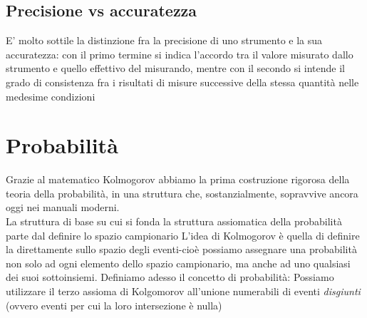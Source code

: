 \documentclass{report}
\begin{document}
	\section{Precisione vs accuratezza}
	E' molto sottile la distinzione fra la precisione di uno strumento e la sua accuratezza: con il primo termine si indica l'accordo tra il valore misurato dallo strumento e quello effettivo del misurando, mentre con il secondo si intende il grado di consistenza fra i risultati di misure successive della stessa quantità nelle medesime condizioni
	\chapter{Probabilità}
	Grazie al matematico Kolmogorov abbiamo la prima costruzione rigorosa della teoria della probabilità, in una struttura che, sostanzialmente, sopravvive ancora oggi nei manuali moderni. \\
	La struttura di base su cui si fonda la struttura assiomatica della probabilità parte dal definire lo spazio campionario
\noindent L'idea di Kolmogorov è quella di definire la  direttamente sullo spazio degli eventi-cioè possiamo assegnare una probabilità non solo ad ogni elemento dello spazio campionario, ma anche ad uno qualsiasi dei suoi sottoinsiemi.
	Definiamo adesso il concetto di probabilità:
\noindent Possiamo utilizzare il terzo assioma di Kolgomorov all'unione numerabili di eventi \emph{disgiunti} (ovvero eventi per cui la loro intersezione è nulla)
\end{document}
